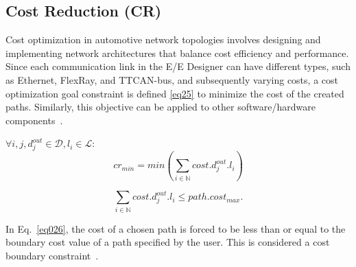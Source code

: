     
    \subsection{Cost Reduction (CR)} 
    
    Cost optimization in automotive network topologies involves designing and implementing network architectures that balance cost efficiency and performance.
    Since each communication link in the E/E Designer can have different types, such as Ethernet, FlexRay, and TTCAN-bus, and subsequently varying costs, a cost optimization goal constraint is defined \eqref{eq25} to minimize the cost of the created paths. Similarly, this objective can be applied to other software/hardware components~\cite{9565115, 9613692, 9212001,askaripoor2023designer}.\newline
    
    
    
    $\forall i,j, d_j^{out} \in\mathcal{D}, l_i \in\mathcal{L}$:
        \begin{equation}
        	cr_{min} =  min (\sum_{i \in \mathbb{N}} cost.d_j^{out}.l_{i})  
        	\label{eq25}
        \end{equation}
    
        \begin{equation}
    	\sum_{i \in \mathbb{N}} cost.d_j^{out}.l_{i} \leq path.cost_{max}.
    	\label{eq026}
        \end{equation}\newline
    
    In Eq.~\eqref{eq026}, the cost of a chosen path is forced to be less than or equal to the boundary cost value of a path specified by the user. This is considered a cost boundary constraint~\cite{askaripoor2023designer, 9565115}.
    
    
